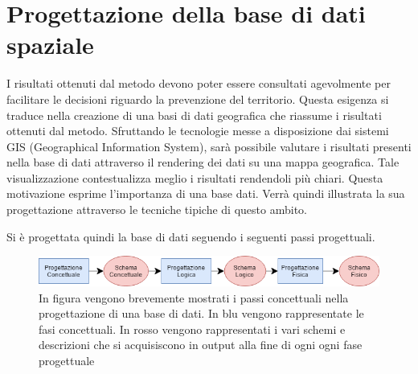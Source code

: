 
\chapter{Progettazione della base di dati spaziale} %
I risultati ottenuti dal metodo devono poter essere consultati agevolmente per facilitare le decisioni riguardo 
la prevenzione del territorio. Questa esigenza si traduce nella creazione di una basi di dati geografica che riassume i risultati ottenuti dal metodo. Sfruttando le tecnologie messe a disposizione dai sistemi GIS (Geographical Information System), sarà possibile valutare i risultati presenti nella base di dati attraverso il rendering dei dati su una mappa geografica. Tale visualizzazione contestualizza meglio i risultati rendendoli più chiari. Questa motivazione esprime l'importanza di una base dati. Verrà quindi illustrata la sua progettazione attraverso le tecniche tipiche di questo ambito.


Si è progettata quindi la base di dati seguendo i seguenti passi progettuali.

\begin{figure}[h]
	\centering
	\includegraphics[width=1\textwidth]{images/Progettazione.png}
	\caption{In figura vengono brevemente mostrati i passi concettuali nella progettazione di una base di dati. In blu vengono rappresentate le fasi concettuali. In rosso vengono rappresentati i vari schemi e descrizioni che si acquisiscono in output alla fine di ogni ogni fase progettuale}
	\label{fig:diagrammaER}
\end{figure}

